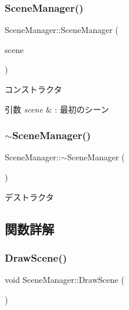 \subsubsection{\texorpdfstring{Scene\+Manager()}{SceneManager()}}
{\footnotesize\ttfamily Scene\+Manager\+::\+Scene\+Manager (\begin{DoxyParamCaption}\item[{\mbox{\hyperlink{class_scene_base}{Scene\+Base}} $\ast$}]{scene }\end{DoxyParamCaption})}



コンストラクタ 


\begin{DoxyParams}{引数}
{\em scene} & \+: 最初のシーン \\
\hline
\end{DoxyParams}
\mbox{\label{class_scene_manager_a2bb376a85d29e85f47753e26c7539229}} 
\subsubsection{\texorpdfstring{$\sim$\+Scene\+Manager()}{~SceneManager()}}
{\footnotesize\ttfamily Scene\+Manager\+::$\sim$\+Scene\+Manager (\begin{DoxyParamCaption}{ }\end{DoxyParamCaption})}



デストラクタ 



\subsection{関数詳解}
\mbox{\label{class_scene_manager_a828b35826f757b8af34aa767c6b40378}} 
\subsubsection{\texorpdfstring{Draw\+Scene()}{DrawScene()}}
{\footnotesize\ttfamily void Scene\+Manager\+::\+Draw\+Scene (\begin{DoxyParamCaption}{ }\end{DoxyParamCaption})}



